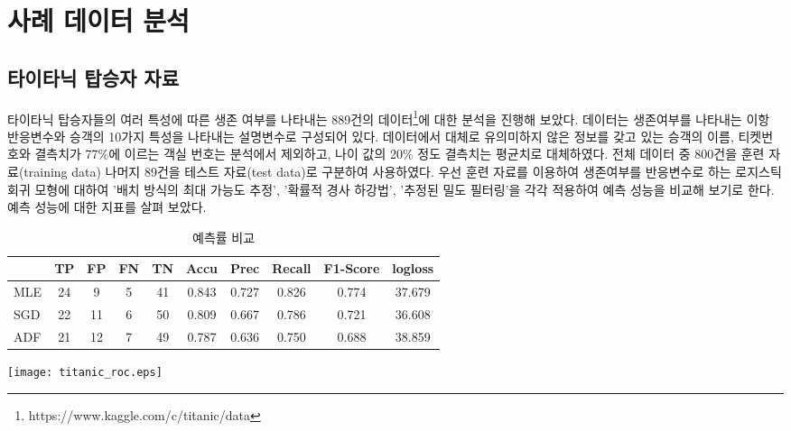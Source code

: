 \documentclass[oneside,b5paper,11pt]{book} %
\begin{document}
\section{사례 데이터 분석}
\subsection{타이타닉 탑승자 자료}
 타이타닉 탑승자들의 여러 특성에 따른 생존 여부를 나타내는 889건의 데이터\footnote{https://www.kaggle.com/c/titanic/data}에 대한 분석을 진행해 보았다. 데이터는 생존여부를 나타내는 이항 반응변수와 승객의 10가지 특성을 나타내는 설명변수로 구성되어 있다. 데이터에서 대체로 유의미하지 않은 정보를 갖고 있는 승객의 이름, 티켓번호와 결측치가 77$\%$에 이르는 객실 번호는 분석에서 제외하고, 나이 값의 20$\%$ 정도 결측치는 평균치로 대체하였다. 전체 데이터 중 800건을 훈련 자료(training data) 나머지 89건을 테스트 자료(test data)로 구분하여 사용하였다.
 우선 훈련 자료를 이용하여 생존여부를 반응변수로 하는 로지스틱 회귀 모형에 대하여 '배치 방식의 최대 가능도 추정', '확률적 경사 하강법', '추정된 밀도 필터링'을 각각 적용하여 예측 성능을 비교해 보기로 한다. 예측 성능에 대한 지표를 살펴 보았다.


\begin{table}[ht]
	\centering
	\begin{tabular}{cccccccccc}
	\hline\hline
	\textbf{} & \textbf{TP} & \textbf{FP} & \textbf{FN} & \textbf{TN} & \textbf{Accu} & \textbf{Prec} & \textbf{Recall} & \textbf{F1-Score} & \textbf{logloss}  \\ 
	\hline 
	
	\multicolumn {1}{l|}{MLE} & 24 & 9  & 5 & 41 & 0.843 & 0.727 & 0.826 & 0.774 & 37.679 \\ \hline
	\multicolumn {1}{l|}{SGD} & 22 & 11 & 6 & 50 & 0.809 & 0.667 & 0.786 & 0.721 & 36.608 \\ \hline
	\multicolumn {1}{l|}{ADF} & 21 & 12 & 7 & 49 & 0.787 & 0.636 & 0.750 & 0.688 & 38.859 \\ \hline

	\hline
	\end{tabular}
	
	\caption[예측률 비교]{예측률 비교}
\end{table}


\begin{center}
\texttt{[image: titanic\_roc.eps]} %
\end{center}
\end{document}
